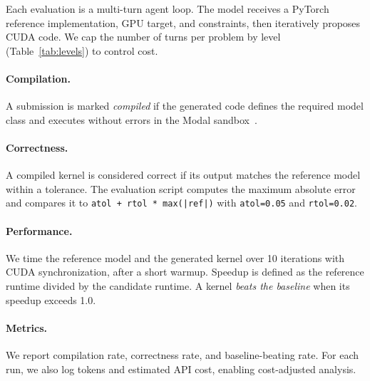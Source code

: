 Each evaluation is a multi-turn agent loop. The model receives a PyTorch reference implementation, GPU target, and constraints, then iteratively proposes CUDA code. We cap the number of turns per problem by level (Table~\ref{tab:levels}) to control cost.

\paragraph{Compilation.} A submission is marked \emph{compiled} if the generated code defines the required model class and executes without errors in the Modal sandbox~\cite{modal-docs}.

\paragraph{Correctness.} A compiled kernel is considered correct if its output matches the reference model within a tolerance. The evaluation script computes the maximum absolute error and compares it to \texttt{atol + rtol * max(|ref|)} with \texttt{atol=0.05} and \texttt{rtol=0.02}.

\paragraph{Performance.} We time the reference model and the generated kernel over 10 iterations with CUDA synchronization, after a short warmup. Speedup is defined as the reference runtime divided by the candidate runtime. A kernel \emph{beats the baseline} when its speedup exceeds 1.0.

\paragraph{Metrics.} We report compilation rate, correctness rate, and baseline-beating rate. For each run, we also log tokens and estimated API cost, enabling cost-adjusted analysis.
